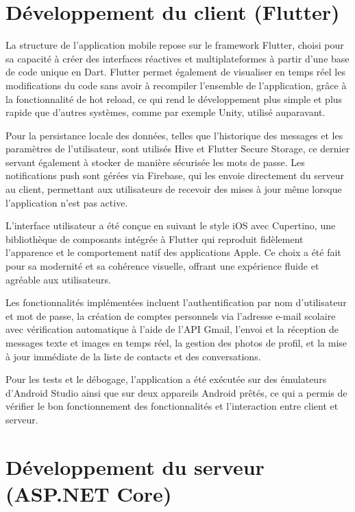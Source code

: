 \documentclass[12pt]{report}
\begin{document}
\section{Développement du client (Flutter)}

La structure de l’application mobile repose sur le framework Flutter\supercite{flutter}, choisi pour sa capacité à créer des interfaces réactives et multiplateformes à partir d’une base de code unique en Dart\supercite{dart}. Flutter permet également de visualiser en temps réel les modifications du code sans avoir à recompiler l’ensemble de l’application, grâce à la fonctionnalité de hot reload, ce qui rend le développement plus simple et plus rapide que d’autres systèmes, comme par exemple Unity, utilisé auparavant.

Pour la persistance locale des données, telles que l’historique des messages et les paramètres de l’utilisateur, sont utilisés Hive\supercite{hive} et Flutter Secure Storage\supercite{securestorage}, ce dernier servant également à stocker de manière sécurisée les mots de passe. Les notifications push sont gérées via Firebase\supercite{firebase}, qui les envoie directement du serveur au client, permettant aux utilisateurs de recevoir des mises à jour même lorsque l’application n’est pas active.

L’interface utilisateur a été conçue en suivant le style iOS avec Cupertino, une bibliothèque de composants intégrée à Flutter qui reproduit fidèlement l’apparence et le comportement natif des applications Apple. Ce choix a été fait pour sa modernité et sa cohérence visuelle, offrant une expérience fluide et agréable aux utilisateurs.

Les fonctionnalités implémentées incluent l’authentification par nom d’utilisateur et mot de passe, la création de comptes personnels via l’adresse e-mail scolaire avec vérification automatique à l’aide de l’API Gmail\supercite{gmailapi}, l’envoi et la réception de messages texte et images en temps réel, la gestion des photos de profil, et la mise à jour immédiate de la liste de contacts et des conversations.

Pour les tests et le débogage, l’application a été exécutée sur des émulateurs d’Android Studio ainsi que sur deux appareils Android prêtés, ce qui a permis de vérifier le bon fonctionnement des fonctionnalités et l’interaction entre client et serveur.

\section{Développement du serveur (ASP.NET Core)}
\end{document}
